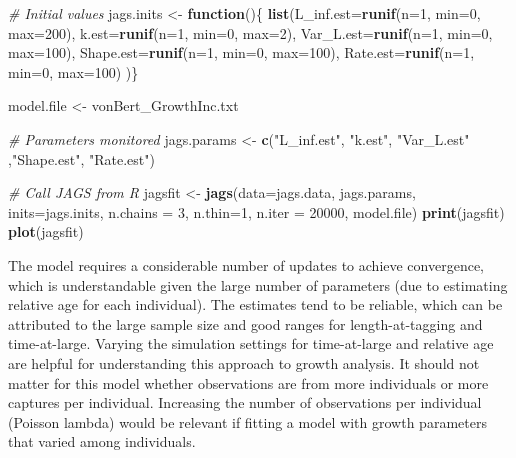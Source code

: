\documentclass[
]{krantz}
\makeatletter
\newenvironment{Shaded}{\begin{snugshade}}{\end{snugshade}}
\newcommand{\AttributeTok}[1]{\textcolor[rgb]{0.27,0.27,0.27}{#1}}
\newcommand{\CommentTok}[1]{\textcolor[rgb]{0.37,0.37,0.37}{\textit{#1}}}
\newcommand{\ControlFlowTok}[1]{\textcolor[rgb]{0.27,0.27,0.27}{\textbf{#1}}}
\newcommand{\DecValTok}[1]{\textcolor[rgb]{0.06,0.06,0.06}{#1}}
\newcommand{\FunctionTok}[1]{\textcolor[rgb]{0.27,0.27,0.27}{\textbf{#1}}}
\newcommand{\NormalTok}[1]{#1}
\newcommand{\OtherTok}[1]{\textcolor[rgb]{0.37,0.37,0.37}{#1}}
\newcommand{\StringTok}[1]{\textcolor[rgb]{0.5,0.5,0.5}{#1}}
\newenvironment{kframe}{%
\medskip{}
\setlength{\fboxsep}{.8em}
 \def\at@end@of@kframe{}%
 \ifinner\ifhmode%
  \def\at@end@of@kframe{\end{minipage}}%
  \begin{minipage}{\columnwidth}%
 \fi\fi%
 \def\FrameCommand##1{\hskip\@totalleftmargin \hskip-\fboxsep
 \colorbox{shadecolor}{##1}\hskip-\fboxsep
     \hskip-\linewidth \hskip-\@totalleftmargin \hskip\columnwidth}%
 \MakeFramed {\advance\hsize-\width
   \@totalleftmargin\z@ \linewidth\hsize
   \@setminipage}}%
 {\par\unskip\endMakeFramed%
 \at@end@of@kframe}
\renewenvironment{Shaded}{\begin{kframe}}{\end{kframe}}
\makeatother
\begin{document}
\begin{Shaded}
\begin{Highlighting}[]
\CommentTok{\# Initial values}
\NormalTok{jags.inits }\OtherTok{\textless{}{-}} \ControlFlowTok{function}\NormalTok{()\{ }\FunctionTok{list}\NormalTok{(}\AttributeTok{L\_inf.est=}\FunctionTok{runif}\NormalTok{(}\AttributeTok{n=}\DecValTok{1}\NormalTok{, }\AttributeTok{min=}\DecValTok{0}\NormalTok{, }\AttributeTok{max=}\DecValTok{200}\NormalTok{),}
                               \AttributeTok{k.est=}\FunctionTok{runif}\NormalTok{(}\AttributeTok{n=}\DecValTok{1}\NormalTok{, }\AttributeTok{min=}\DecValTok{0}\NormalTok{, }\AttributeTok{max=}\DecValTok{2}\NormalTok{),}
                               \AttributeTok{Var\_L.est=}\FunctionTok{runif}\NormalTok{(}\AttributeTok{n=}\DecValTok{1}\NormalTok{, }\AttributeTok{min=}\DecValTok{0}\NormalTok{, }\AttributeTok{max=}\DecValTok{100}\NormalTok{),}
                               \AttributeTok{Shape.est=}\FunctionTok{runif}\NormalTok{(}\AttributeTok{n=}\DecValTok{1}\NormalTok{, }\AttributeTok{min=}\DecValTok{0}\NormalTok{, }\AttributeTok{max=}\DecValTok{100}\NormalTok{),}
                               \AttributeTok{Rate.est=}\FunctionTok{runif}\NormalTok{(}\AttributeTok{n=}\DecValTok{1}\NormalTok{, }\AttributeTok{min=}\DecValTok{0}\NormalTok{, }\AttributeTok{max=}\DecValTok{100}\NormalTok{)}
\NormalTok{                               )\}}

\NormalTok{model.file }\OtherTok{\textless{}{-}} \StringTok{\textquotesingle{}vonBert\_GrowthInc.txt\textquotesingle{}}

\CommentTok{\# Parameters monitored}
\NormalTok{jags.params }\OtherTok{\textless{}{-}} \FunctionTok{c}\NormalTok{(}\StringTok{"L\_inf.est"}\NormalTok{, }\StringTok{"k.est"}\NormalTok{, }\StringTok{"Var\_L.est"}\NormalTok{ ,}\StringTok{"Shape.est"}\NormalTok{,}
                 \StringTok{"Rate.est"}\NormalTok{)}

\CommentTok{\# Call JAGS from R}
\NormalTok{jagsfit }\OtherTok{\textless{}{-}} \FunctionTok{jags}\NormalTok{(}\AttributeTok{data=}\NormalTok{jags.data, jags.params, }\AttributeTok{inits=}\NormalTok{jags.inits,}
                \AttributeTok{n.chains =} \DecValTok{3}\NormalTok{, }\AttributeTok{n.thin=}\DecValTok{1}\NormalTok{, }\AttributeTok{n.iter =} \DecValTok{20000}\NormalTok{,}
\NormalTok{                model.file)}
\FunctionTok{print}\NormalTok{(jagsfit)}
\FunctionTok{plot}\NormalTok{(jagsfit)}
\end{Highlighting}
\end{Shaded}

The model requires a considerable number of updates to achieve convergence, which is understandable given the large number of parameters (due to estimating relative age for each individual). The estimates tend to be reliable, which can be attributed to the large sample size and good ranges for length-at-tagging and time-at-large. Varying the simulation settings for time-at-large and relative age are helpful for understanding this approach to growth analysis. It should not matter for this model whether observations are from more individuals or more captures per individual. Increasing the number of observations per individual (Poisson lambda) would be relevant if fitting a model with growth parameters that varied among individuals.
\end{document}
